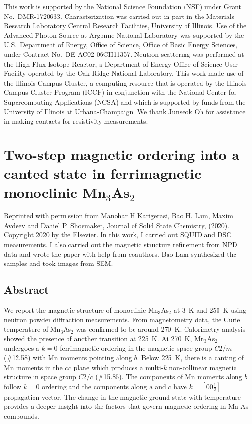 \documentclass[10pt,doublespacing,edeposit]{uiucthesis2020}
\begin{document}
\begin{mainmatter}
This work is supported by the National Science Foundation (NSF) under Grant No.\ DMR-1720633.
Characterization was carried out in part in the Materials Research Laboratory Central Research Facilities, University of Illinois. Use of the Advanced Photon Source at Argonne National Laboratory was supported by the U.S.\ Department of Energy, Office of Science, Office of Basic Energy Sciences, under Contract No.\ DE-AC02-06CH11357. Neutron scattering was performed at the High Flux Isotope Reactor, a Department of Energy Office of Science User Facility operated by the Oak Ridge National Laboratory.
This work made use of the Illinois Campus Cluster, a computing resource that is operated by the Illinois Campus Cluster Program (ICCP) in conjunction with the National Center for Supercomputing Applications (NCSA) and which is supported by funds from the University of Illinois at Urbana-Champaign.
We thank Junseok Oh for assistance in making contacts for resistivity measurements.

\chapter{Two-step magnetic ordering into a canted state in ferrimagnetic monoclinic Mn$_3$As$_2$}


\hfill \break

\href{https://arxiv.org/abs/2008.01776}{Reprinted with permission from Manohar H Karigerasi, Bao H. Lam, Maxim Avdeev and Daniel P. Shoemaker, Journal of Solid State Chemistry, (2020). Copyright 2020 by the Elsevier.} In this work, I carried out SQUID and DSC measurements. I also carried out the magnetic structure refinement from NPD data and wrote the paper with help from coauthors. Bao Lam synthesized the samples and took images from SEM.


\section{Abstract}

We report the magnetic structure of monoclinic Mn$_3$As$_2$ at 3~K and 250~K using neutron powder diffraction measurements. From magnetometry data, the Curie temperature of Mn$_3$As$_2$ was confirmed to be around 270~K. Calorimetry analysis showed the presence of another transition at 225~K. At 270~K, Mn$_3$As$_2$ undergoes a $k = 0$ ferrimagnetic ordering in the magnetic space group $C2/m$ (\#12.58) with Mn moments pointing along $b$. Below 225~K, there is a canting of Mn moments in the $ac$ plane which produces a multi-$k$  non-collinear magnetic structure in space group $C2/c$ (\#15.85). The components of Mn moments along $b$ follow $k=0$ ordering and the components along $a$ and $c$ have $k = [0 0 \frac{1}{2}]$ propagation vector. The change in the magnetic ground state with temperature provides a deeper insight into the factors that govern magnetic ordering in Mn-As compounds.


\end{mainmatter}
\end{document}
